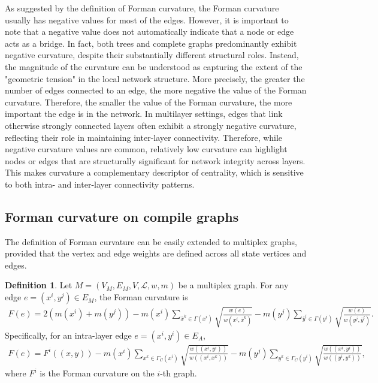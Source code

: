 \documentclass[preprint,12pt,number]{elsarticle}
\theoremstyle{plain} %
\theoremstyle{definition} %
\newtheorem{definition}[theorem]{\indent\sc Definition}
\begin{document}
  As suggested by the definition of Forman curvature, the Forman curvature usually has negative values for most of the edges. However, it is important to note that a negative value does not automatically indicate that a node or edge acts as a bridge. In fact, both trees and complete graphs predominantly exhibit negative curvature, despite their substantially different structural roles. Instead, the magnitude of the curvature can be understood as capturing the extent of the "geometric tension" in the local network structure. More precisely, the greater the number of edges connected to an edge, the more negative the value of the Forman curvature. Therefore, the smaller the value of the Forman curvature, the more important the edge is in the network.
  In multilayer settings, edges that link otherwise strongly connected layers often exhibit a strongly negative curvature, reflecting their role in maintaining inter-layer connectivity. Therefore, while negative curvature values are common, relatively low curvature can highlight nodes or edges that are structurally significant for network integrity across layers. This makes curvature a complementary descriptor of centrality, which is sensitive to both intra- and inter-layer connectivity patterns.

\subsection{Forman curvature on compile graphs}
The definition of Forman curvature can be easily extended to multiplex graphs, provided that the vertex and edge weights are defined across all state vertices and edges.
\begin{definition}
    Let $M = (V_M, E_M, V, \mathcal{L}, w, m)$ be a multiplex graph. For any edge $e =(x^i, y^j) \in E_M$, the Forman curvature is
    \begin{eqnarray*}
        F(e) = 2(m(x^i) +m(y^j)) - m(x^i)\sum_{\bar{x}^k \in \Gamma(x^i)} \sqrt{\frac{w(e)}{w(x^i,\bar{x}^k)}} - m(y^j)\sum_{\bar{y}^l \in \Gamma(y^j)}\sqrt{\frac{w(e)}{w(y^j,\bar{y}^l)}}.
    \end{eqnarray*}
    Specifically, for an intra-layer edge $e = (x^i,y^i) \in E_A$,
    \begin{eqnarray*}
        F(e) = F^i((x,y)) - m(x^i)\sum_{x^k \in \Gamma_C(x^i)} \sqrt{\frac{w((x^i,y^i))}{w((x^i,x^k))}} - m(y^j)\sum_{y^k \in \Gamma_C(y^i)}\sqrt{\frac{w((x^i,y^i))}{w((y^i,y^k))}},
    \end{eqnarray*}
    where $F^i$ is the Forman curvature on the $i$-th graph.
\end{definition}
\end{document}
